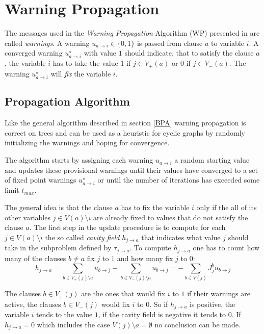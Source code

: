 \section{Warning Propagation}

The messages used in the \emph{Warning Propagation} Algorithm (WP) presented in \cite{survprob} are called \emph{warnings}. A warning $u_{a\rightarrow i} \in \{0, 1\}$ is passed from clause $a$ to variable $i$. A converged warning  $u^{\star}_{a\rightarrow i}$ with value $1$ should indicate, that  to satisfy the clause $a$, the variable $i$ has to take the value $1$ if $j \in V_+(a)$ or $0$ if $j \in V_-(a)$. The warning $u^{\star}_{a \rightarrow i}$ will \emph{fix} the variable $i$. 
\subsection{Propagation Algorithm}

Like the general algorithm described in section \ref{BPA} warning propagation is correct on trees and can be used as a heuristic for cyclic graphs by randomly initializing the warnings and hoping for convergence.

The algorithm starts by assigning each warning $u_{a\rightarrow i}$ a random starting value and updates these provisional warnings until their values have converged to a set of fixed point warnings $u^{\star}_{a \rightarrow i}$ or until the number of iterations has exceeded some limit $t_{max}$.

The general idea is that the clause $a$ has to fix the variable $i$ only if the all of its other variables $j \in V(a)\setminus i$ are already fixed to values that do not satisfy the clause $a$. \newline
The first step in the update procedure is to compute for each $j \in V(a) \setminus i$ the so called \emph{cavity field} $h_{j \rightarrow a}$ that indicates what value $j$ should take in the subproblem defined by $\tau_{j \rightarrow a}$. To compute $h_{j \rightarrow a}$ one has to count how many of the clauses $b \neq a$ fix $j$ to $1$ and how many fix $j$ to $0$:
$$h_{j \rightarrow a} = \sum_{b \in V_+(j)\setminus a}{u_{b \rightarrow j}} - \sum_{b \in V_-(j)\setminus a}{u_{b \rightarrow j}} = -\sum_{b \in V(j)} J^b_j u_{b \rightarrow j}$$

The clauses $b \in V_+(j)$ are the ones that would fix $i$ to $1$ if their warnings are active, the clauses $b \in V_-(j)$ would fix $i$ to $0$.
So if $h_{j \rightarrow a}$ is positive, the variable $i$ tends to the value $1$, if the cavity field is negative it tends to $0$. If $h_{j \rightarrow a} = 0$ which includes the case $V(j) \setminus a = \emptyset$ no conclusion can be made.

